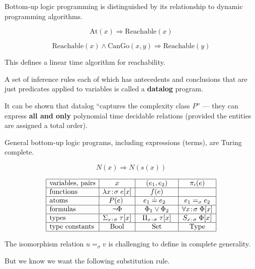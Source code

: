 {Bottom-up logic programming is distinguished by its relationship to dynamic programming algorithms.

\vfill
$$\mathrm{At}(x) \Rightarrow \mathrm{Reachable}(x)$$

\vfill
$$\mathrm{Reachable}(x) \wedge \mathrm{CanGo}(x,y) \Rightarrow \mathrm{Reachable}(y)$$

\vfill
This defines a linear time algorithm for reachability.


A set of inference rules each of which has antecedents and conclusions that are just predicates applied to variables is called a {\bf datalog} program.

\vfill
It can be shown that datalog ``captures the complexity class $P$'' --- they can express {\bf all and only} polynomial time decidable relations
(provided the entities are assigned a total order).

\vfill
General bottom-up logic programs, including expressions (terms), are Turing complete.

$$N(x) \Rightarrow N(s(x))$$


  $$
  \begin{array}{|l|c|c|c|c|}
  \hline
    \mbox{variables, pairs} & x & (e_1,e_2) & \pi_i(e) \\ \hline 
    \mbox{functions} & \lambda \intype{x}{\sigma}\;e[x] & f(e) & \\ \hline 
    \mbox{atoms} & ~~P(e)~~~ & ~~ e_1 \doteq e_2 ~~~~ & e_1 =_\sigma e_2 \\ \hline
    \mbox{formulas} & \neg \Phi &  \Phi_1 \vee \Phi_2 & \forall \intype{x}{\sigma}\; \Phi[x] \\ \hline
    \mbox{types}   & \Sigma_{\intype{x\;}{\;\sigma}}\;\tau[x] & \Pi_{\intype{x\;}{\;\sigma}}\;\tau[x] & S_{\intype{x\;}{\;\sigma}}\;\Phi[x]  \\ \hline
    \mbox{type constants} & \mathrm{Bool} & \mathrm{Set} & \mathrm{Type} \\ \hline
  \end{array}
  $$




The isomorphism relation $u =_\sigma v$ is challenging to define in complete generality.

\vfill
But we know we want the following substitution rule.

}
